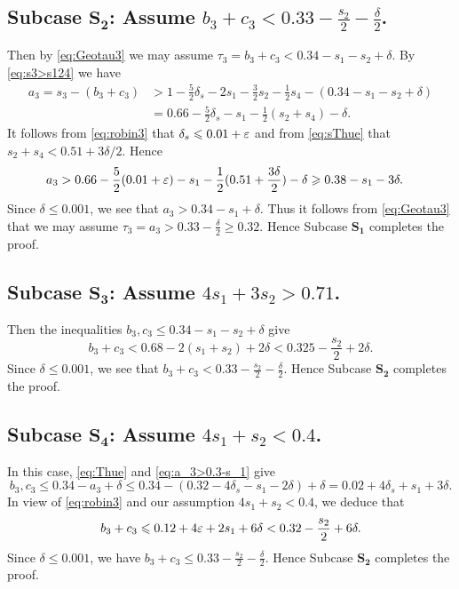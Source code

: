 \subsection*{Subcase $\mathbf{S_2}$: Assume
$b_3+c_3<0.33-\frac{s_2}{2}-\frac{\delta}{2}$.}

Then by \eqref{eq:Geotau3} we may assume $\tau_3=b_3+c_3<0.34-s_1-s_2+\delta$. By \eqref{eq:s3>s124} we have
\begin{align*}
a_3 = s_3 - (b_3+c_3) &> 1 - \frac{5}{2}\delta_s - 2s_1 - \frac{3}{2}s_2 - \frac{1}{2}s_4 - (0.34-s_1-s_2+ \delta)\\
& = 0.66- \frac{5}{2}\delta_s - s_1 - \frac{1}{2}(s_2+s_4)-\delta.
\end{align*}
It follows from \eqref{eq:robin3} that $\delta_s\leqslant 0.01+\varepsilon$ and from
 \eqref{eq:sThue} that $s_2+s_4<0.51+3\delta/2$. Hence
 \begin{align*}
a_3
& > 0.66- \frac{5}{2}(0.01+\varepsilon) - s_1 - \frac{1}{2}(0.51+\frac{3\delta}{2}) - \delta \geqslant 0.38-s_1- 3\delta.
\end{align*}
Since $\delta\le 0.001$, we see that $a_3> 0.34-s_1+ \delta$.
Thus it follows from \eqref{eq:Geotau3} that we may assume  $\tau_3=a_3>0.33-\frac{\delta}{2}\geq 0.32$. Hence Subcase
$\mathbf{S_1}$ completes the proof.



\subsection*{Subcase $\mathbf{S_3}$: Assume $4s_1+3s_2>0.71$.}

Then the inequalities $b_3,c_3 \le 0.34-s_1-s_2+ \delta$ give
$$
b_3+c_3<0.68-2(s_1+s_2)+2\delta<
0.325 -\frac{s_2}{2}+2\delta.
$$
Since $\delta\leq 0.001$, we see that $b_3+c_3<0.33-\frac{s_2}{2}-\frac{\delta}{2}$. Hence Subcase $\mathbf{S_2}$ completes the proof.


\subsection*{Subcase $\mathbf{S_4}$: Assume $4s_1+s_2<0.4$.}


In this case, \eqref{eq:Thue} and \eqref{eq:a_3>0.3-s_1} give
$$
b_3,c_3 \le 0.34-a_3+\delta \le 0.34 - (0.32-4\delta_s-s_1-2\delta) +\delta= 0.02+4\delta_s+s_1+3\delta.
$$
In view of \eqref{eq:robin3} and
our assumption $4s_1+s_2<0.4$, we deduce that
\begin{align*}
b_3+c_3 \leqslant 0.12+4\varepsilon + 2s_1+6\delta <
0.32-\frac{s_2}{2}+6\delta.
\end{align*}
Since $\delta\leq 0.001$, we have $b_3+c_3 \le 0.33-\frac{s_2}{2}-\frac{\delta}{2}$. Hence
Subcase $\mathbf{S_2}$ completes the proof.



